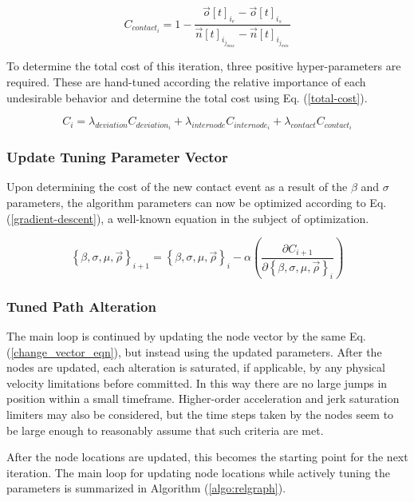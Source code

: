 \documentclass[conf]{new-aiaa}
\begin{document}
\begin{equation}
\label{contact_eqn}
C_{contact_i} = 1 - \frac{\vec{o}[t]_{i_{e}} - \vec{o}[t]_{i_{s}}}{\vec{n}[t]_{i_{j_{max}}} - \vec{n}[t]_{i_{j_{min}}}}
\end{equation}

To determine the total cost of this iteration, three positive hyper-parameters are required. These are hand-tuned according the relative importance of each undesirable behavior and determine the total cost using Eq. (\ref{total-cost}).

\begin{equation}
\label{total-cost}
C_i = \lambda_{deviation}C_{deviation_i} + \lambda_{internode}C_{internode_i} + \lambda_{contact}C_{contact_i}
\end{equation}


\subsubsection{Update Tuning Parameter Vector}
Upon determining the cost of the new contact event as a result of the $\beta$ and $\sigma$ parameters, the algorithm parameters can now be optimized according to Eq. (\ref{gradient-descent}),  a well-known equation in the subject of optimization.

\begin{equation}
\label{gradient-descent}
\left\{\beta, \sigma, \mu, \vec{\rho}\right\}_{i + 1} = \left\{\beta, \sigma, \mu, \vec{\rho}\right\}_i - \alpha\left(\frac{\partial{C_{i + 1}}}{\partial{\left\{\beta, \sigma, \mu, \vec{\rho}\right\}_i}}\right)
\end{equation}


\subsubsection{Tuned Path Alteration}
The main loop is continued by updating the node vector by the same Eq. (\ref{change_vector_eqn}), but instead using the updated parameters. After the nodes are updated, each alteration is saturated, if applicable, by any physical velocity limitations before committed. In this way there are no large jumps in position within a small timeframe. Higher-order acceleration and jerk saturation limiters may also be considered, but the time steps taken by the nodes seem to be large enough to reasonably assume that such criteria are met.

After the node locations are updated, this becomes the starting point for the next iteration. The main loop for updating node locations while actively tuning the parameters is summarized in Algorithm (\ref{algo:relgraph}).
\end{document}
